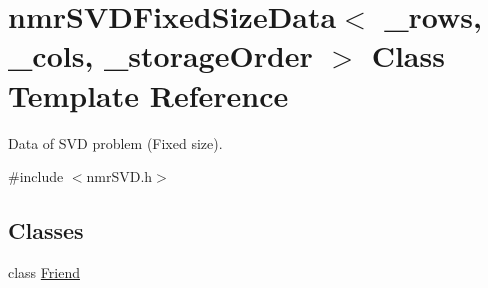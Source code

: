 \hypertarget{classnmr_s_v_d_fixed_size_data}{}\section{nmr\+S\+V\+D\+Fixed\+Size\+Data$<$ \+\_\+rows, \+\_\+cols, \+\_\+storage\+Order $>$ Class Template Reference}
\label{classnmr_s_v_d_fixed_size_data}


Data of S\+V\+D problem (Fixed size).  




{\ttfamily \#include $<$nmr\+S\+V\+D.\+h$>$}

\subsection*{Classes}
\begin{DoxyCompactItemize}
\item 
class \hyperlink{classnmr_s_v_d_fixed_size_data_1_1_friend}{Friend}
\end{DoxyCompactItemize}
